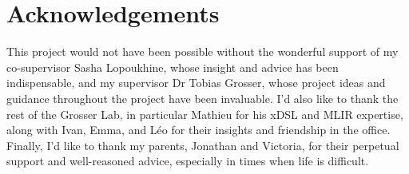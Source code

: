 \ifsubmission\else

\chapter*{Acknowledgements}

This project would not have been possible without the wonderful support of my co-supervisor Sasha Lopoukhine, whose insight and advice has been indispensable, and my supervisor Dr Tobias Grosser, whose project ideas and guidance throughout the project have been invaluable.
I'd also like to thank the rest of the Grosser Lab, in particular Mathieu for his xDSL and MLIR expertise, along with Ivan, Emma, and L\'eo for their insights and friendship in the office.
Finally, I'd like to thank my parents, Jonathan and Victoria, for their perpetual support and well-reasoned advice, especially in times when life is difficult.

\fi
\cleardoublepage %
